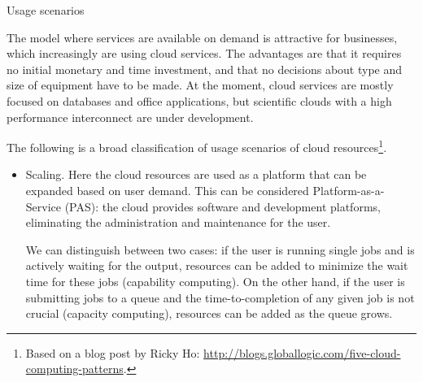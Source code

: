  {Usage scenarios}

The model where services are available on demand is attractive for
businesses, which increasingly are using cloud services. The
advantages are that it requires no initial monetary and time
investment, and that no decisions about type and size of equipment
have to be made. At the moment, cloud services are mostly focused on
databases and office applications, but scientific clouds with a high
performance interconnect are under development.

The following is a broad classification of usage scenarios of cloud
resources\footnote{Based on a blog post by Ricky Ho:
  \url{http://blogs.globallogic.com/five-cloud-computing-patterns}.}.
\begin{itemize}
\item Scaling. Here the cloud resources are used as a platform that
  can be expanded based on user demand. This can be considered
  Platform-as-a-Service (PAS): the cloud provides software and development platforms,
  eliminating the administration and maintenance for the user. 

  We can distinguish between two cases: if the user is running single
  jobs and is actively waiting for the output, resources can be added
  to minimize the wait time for these jobs (capability computing). On
  the other hand, if the user is submitting jobs to a queue and the
  time-to-completion of any given job is not crucial (capacity
  computing), resources can be added as the queue grows.


\end{itemize}
